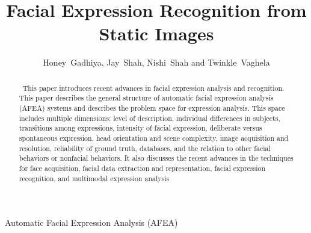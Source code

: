 \documentclass[journal]{IEEEtran}
\begin{document}
%
\title{Facial Expression Recognition from Static Images}
%


\author{Honey~Gadhiya,
        Jay~Shah,
        Nishi~Shah
        and Twinkle~Vaghela%
}





\maketitle


\begin{abstract}
\ This paper introduces recent advances in facial expression analysis and recognition. This paper describes the general structure of automatic facial expression analysis (AFEA) systems and describes the problem space for expression analysis. This space includes multiple dimensions: level of description, individual differences in subjects, transitions among expressions, intensity of facial expression, deliberate versus spontaneous expression, head orientation and scene complexity, image acquisition and resolution, reliability of ground truth, databases, and the relation to other facial behaviors or nonfacial behaviors. It also discusses the recent advances in the techniques for face acquisition, facial data extraction and representation, facial expression recognition, and multimodal expression analysis
\end{abstract}

\begin{IEEEkeywords}
Automatic Facial Expression Analysis (AFEA)
\end{IEEEkeywords}


\IEEEpeerreviewmaketitle
\end{document}
